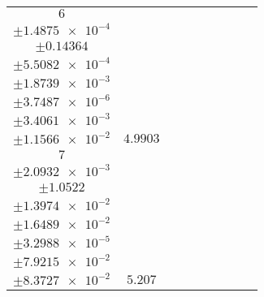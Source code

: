 \documentclass[8pt]{article}
\begin{document}
\begin{longtable}[l]{c c c c c c c c c}
$\num{6}$ & \begin{tabular}[c]{@{}c@{}}$\num{6.0062e-2}$ \\ $\pm\num{1.4875e-4}$\end{tabular} & \begin{tabular}[c]{@{}c@{}}$\num{-0.23848}$ \\ $\pm\num{0.14364}$\end{tabular} & \begin{tabular}[c]{@{}c@{}}$\num{6.9993}$ \\ $\pm\num{5.5082e-4}$\end{tabular} & \begin{tabular}[c]{@{}c@{}}$\num{1.573e+3}$ \\ $\pm\num{1.8739e-3}$\end{tabular} & \begin{tabular}[c]{@{}c@{}}$\num{3.1469}$ \\ $\pm\num{3.7487e-6}$\end{tabular} & \begin{tabular}[c]{@{}c@{}}$\num{1.1659}$ \\ $\pm\num{3.4061e-3}$\end{tabular} & \begin{tabular}[c]{@{}c@{}}$\num{4.1876}$ \\ $\pm\num{1.1566e-2}$\end{tabular} & $\num{4.9903}$\\
$\num{7}$ & \begin{tabular}[c]{@{}c@{}}$\num{8.8381e-2}$ \\ $\pm\num{2.0932e-3}$\end{tabular} & \begin{tabular}[c]{@{}c@{}}$\num{-0.82565}$ \\ $\pm\num{1.0522}$\end{tabular} & \begin{tabular}[c]{@{}c@{}}$\num{4.2286e-3}$ \\ $\pm\num{1.3974e-2}$\end{tabular} & \begin{tabular}[c]{@{}c@{}}$\num{1.5747e+3}$ \\ $\pm\num{1.6489e-2}$\end{tabular} & \begin{tabular}[c]{@{}c@{}}$\num{3.1503}$ \\ $\pm\num{3.2988e-5}$\end{tabular} & \begin{tabular}[c]{@{}c@{}}$\num{5.7971}$ \\ $\pm\num{7.9215e-2}$\end{tabular} & \begin{tabular}[c]{@{}c@{}}$\num{8.4426}$ \\ $\pm\num{8.3727e-2}$\end{tabular} & $\num{5.207}$\\

\end{longtable}
\end{document}
